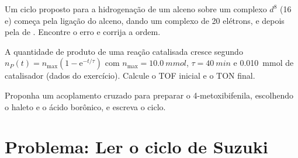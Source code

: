 \begin{exercise}[$\star\star\star$]\label{exo:b2:catalytic-cycles:10}
Um ciclo proposto para a hidrogenação de um alceno sobre um complexo $d^8$  (16 e)
começa pela ligação do alceno, dando um complexo de 20 elétrons, e depois pela
 de . Encontre o erro e corrija a ordem.
\end{exercise}

\begin{exercise}[$\star\star\star$]\label{exo:b2:catalytic-cycles:11}
A quantidade de produto de uma reação catalisada cresce segundo $n_P(t) = n_{\max}(1 - \mathrm e^{-t/\tau})$
com $n_{\max} = \qty{10.0}{mmol}$, $\tau = \qty{40}{min}$ e \qty{0.010}{mmol} de
catalisador (dados do exercício). Calcule o TOF inicial e o TON final.
\end{exercise}

\begin{exercise}[$\star\star\star$]\label{exo:b2:catalytic-cycles:12}
Proponha um acoplamento cruzado para preparar o 4-metoxibifenila, escolhendo o
haleto e o ácido borônico, e escreva o ciclo.
\end{exercise}

\section{Problema: Ler o ciclo de Suzuki}

